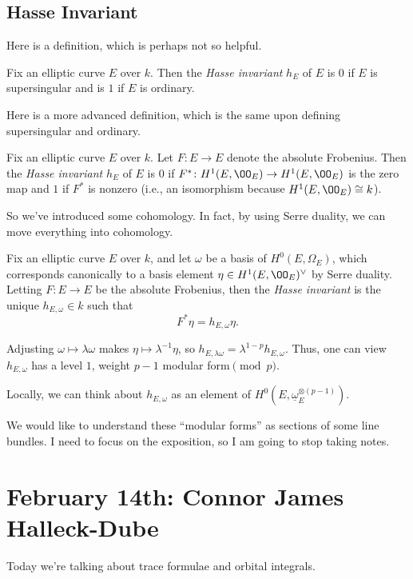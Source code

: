 \documentclass{article}
\begin{document}
\subsection{Hasse Invariant}
Here is a definition, which is perhaps not so helpful.
\begin{definition}
	Fix an elliptic curve $E$ over $k$. Then the \textit{Hasse invariant} $h_E$ of $E$ is $0$ if $E$ is supersingular and is $1$ if $E$ is ordinary.
\end{definition}
Here is a more advanced definition, which is the same upon defining supersingular and ordinary.
\begin{definition}
	Fix an elliptic curve $E$ over $k$. Let $F\colon E\to E$ denote the absolute Frobenius. Then the \textit{Hasse invariant} $h_E$ of $E$ is $0$ if $F^*\colon H^1(E,\OO_E)\to H^1(E,\OO_E)$ is the zero map and $1$ if $F^*$ is nonzero (i.e., an isomorphism because $H^1(E,\OO_E)\cong k$).
\end{definition}
So we've introduced some cohomology. In fact, by using Serre duality, we can move everything into cohomology.
\begin{definition}
	Fix an elliptic curve $E$ over $k$, and let $\omega$ be a basis of $H^0(E,\Omega_E)$, which corresponds canonically to a basis element $\eta\in H^1(E,\OO_E)^\lor$ by Serre duality. Letting $F\colon E\to E$ be the absolute Frobenius, then the \textit{Hasse invariant} is the unique $h_{E,\omega}\in k$ such that
	\[F^*\eta=h_{E,\omega}\eta.\]
\end{definition}
\begin{remark}
	Adjusting $\omega\mapsto\lambda\omega$ makes $\eta\mapsto\lambda^{-1}\eta$, so $h_{E,\lambda\omega}=\lambda^{1-p}h_{E,\omega}$. Thus, one can view $h_{E,\omega}$ has a level $1$, weight $p-1$ modular form$\pmod p$.
\end{remark}
\begin{remark}
	Locally, we can think about $h_{E,\omega}$ as an element of $H^0\left(E,\underline\omega_E^{\otimes(p-1)}\right)$.
\end{remark}
We would like to understand these ``modular forms'' as sections of some line bundles. I need to focus on the exposition, so I am going to stop taking notes.

\section{February 14th: Connor James Halleck-Dube}
Today we're talking about trace formulae and orbital integrals.
\end{document}
